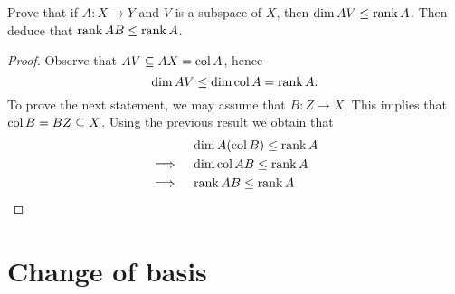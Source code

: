\setcounter{exercise}{3}
\begin{exercise}
  Prove that if $A:X\to Y$ and $V$ is a subspace of $X$, then
  $\dim AV\leq\operatorname{rank} A$. Then deduce that $\operatorname{rank} AB\leq\operatorname{rank} A$.
\end{exercise}
\begin{proof}
  Observe that $AV\subseteq AX=\operatorname{col} A$, hence
  \[\dim AV\leq \dim\operatorname{col} A=\operatorname{rank} A.\]
  To prove the next statement, we may assume that $B:Z\to X$.
  This implies that $\operatorname{col} B=BZ\subseteq X$.
  Using the previous result we obtain that
  \begin{align*}
    &\dim A(\operatorname{col} B)\leq\operatorname{rank} A\\\implies\quad
    &\dim\operatorname{col} AB\leq\operatorname{rank} A\\\implies\quad
    &\operatorname{rank} AB\leq\operatorname{rank} A
  \end{align*}
\end{proof}

\newpage
\section{Change of basis}
\setcounter{exercise}{2}

